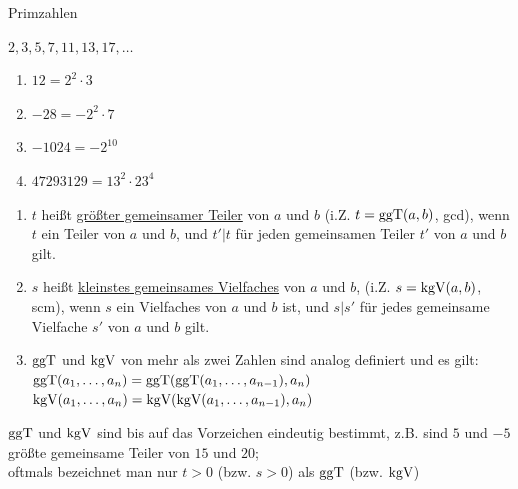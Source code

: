 \Bsp Primzahlen

$2,3,5,7,11,13,17,\ldots$



\Bsps
\begin{enumerate}
	\item $12 = 2^2\cdot 3$
	\item $-28 = -2^2\cdot 7$
	\item $-1024 = -2^{10}$
	\item $47293129 = 13^2\cdot 23^4$
\end{enumerate}

\Def
\begin{enumerate}
	\item $t$ heißt \ul{größter gemeinsamer Teiler} von $a$ und $b$ (i.Z. $t=\mathbin\text{ggT}(a,b)$, gcd), wenn $t$ ein Teiler von $a$ und $b$, und $t'|t$ für jeden gemeinsamen Teiler $t'$ von $a$ und $b$ gilt.
	
	\item $s$ heißt \ul{kleinstes gemeinsames Vielfaches} von $a$ und $b$, (i.Z. $s=\mathbin\text{kgV}(a,b)$, scm), wenn $s$ ein Vielfaches von $a$ und $b$ ist, und $s|s'$ für jedes gemeinsame Vielfache $s'$ von $a$ und $b$ gilt.
	
	\item $\mathbin\text{ggT}$ und $\mathbin\text{kgV}$ von mehr als zwei Zahlen sind analog definiert und es gilt:\\
	$\mathbin\text{ggT}(a_1, \ldots,a_n)=\mathbin\text{ggT}(\mathbin\text{ggT}(a_1, \ldots,a_{n-1}),a_n)$\\
	$\mathbin\text{kgV}(a_1, \ldots,a_n)=\mathbin\text{kgV}(\mathbin\text{kgV}(a_1, \ldots,a_{n-1}),a_n)$
\end{enumerate}

\Bem $\mathbin\text{ggT}$ und $\mathbin\text{kgV}$ sind bis auf das Vorzeichen eindeutig bestimmt, z.B. sind $5$ und $-5$ größte gemeinsame Teiler von $15$ und $20$;\\
oftmals bezeichnet man nur $t>0$ (bzw. $s>0$) als $\mathbin\text{ggT}$ (bzw. $\mathbin\text{kgV}$)


